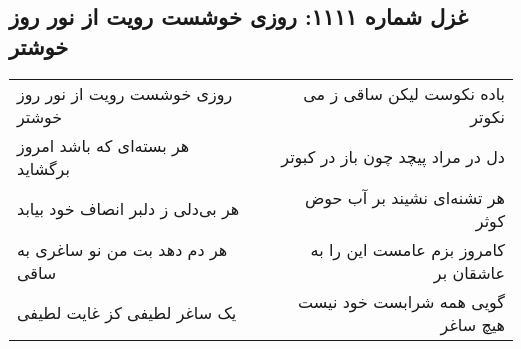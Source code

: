 \begin{center}
\section*{غزل شماره ۱۱۱۱: روزی خوشست رویت از نور روز خوشتر}
\label{sec:1111}
\begin{longtable}{l p{0.5cm} r}
روزی خوشست رویت از نور روز خوشتر
&&
باده نکوست لیکن ساقی ز می نکوتر
\\
هر بسته‌ای که باشد امروز برگشاید
&&
دل در مراد پیچد چون باز در کبوتر
\\
هر بی‌دلی ز دلبر انصاف خود بیابد
&&
هر تشنه‌ای نشیند بر آب حوض کوثر
\\
هر دم دهد بت من نو ساغری به ساقی
&&
کامروز بزم عامست این را به عاشقان بر
\\
یک ساغر لطیفی کز غایت لطیفی
&&
گویی همه شرابست خود نیست هیچ ساغر
\\
\end{longtable}
\end{center}
